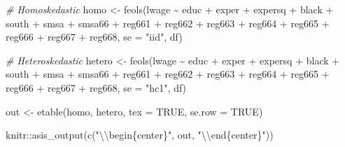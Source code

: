 \documentclass[
]{article}
\newenvironment{Shaded}{\begin{snugshade}}{\end{snugshade}}
\newcommand{\AttributeTok}[1]{\textcolor[rgb]{0.77,0.63,0.00}{#1}}
\newcommand{\CommentTok}[1]{\textcolor[rgb]{0.56,0.35,0.01}{\textit{#1}}}
\newcommand{\ConstantTok}[1]{\textcolor[rgb]{0.00,0.00,0.00}{#1}}
\newcommand{\FunctionTok}[1]{\textcolor[rgb]{0.00,0.00,0.00}{#1}}
\newcommand{\NormalTok}[1]{#1}
\newcommand{\OtherTok}[1]{\textcolor[rgb]{0.56,0.35,0.01}{#1}}
\newcommand{\SpecialCharTok}[1]{\textcolor[rgb]{0.00,0.00,0.00}{#1}}
\newcommand{\StringTok}[1]{\textcolor[rgb]{0.31,0.60,0.02}{#1}}
\begin{document}
\begin{Shaded}
\begin{Highlighting}[]
\CommentTok{\# Homoskedastic}
\NormalTok{homo }\OtherTok{\textless{}{-}} \FunctionTok{feols}\NormalTok{(lwage }\SpecialCharTok{\textasciitilde{}}\NormalTok{ educ }\SpecialCharTok{+}\NormalTok{ exper }\SpecialCharTok{+}\NormalTok{ expersq }\SpecialCharTok{+}\NormalTok{ black }\SpecialCharTok{+}\NormalTok{ south }\SpecialCharTok{+}\NormalTok{ smsa }\SpecialCharTok{+}\NormalTok{ smsa66 }\SpecialCharTok{+}
\NormalTok{              reg661 }\SpecialCharTok{+}\NormalTok{ reg662 }\SpecialCharTok{+}\NormalTok{ reg663 }\SpecialCharTok{+}\NormalTok{ reg664 }\SpecialCharTok{+}\NormalTok{ reg665 }\SpecialCharTok{+}\NormalTok{ reg666 }\SpecialCharTok{+}\NormalTok{ reg667 }\SpecialCharTok{+}\NormalTok{ reg668,}
              \AttributeTok{se =} \StringTok{"iid"}\NormalTok{, df)}

\CommentTok{\# Heteroskedastic}
\NormalTok{hetero }\OtherTok{\textless{}{-}} \FunctionTok{feols}\NormalTok{(lwage }\SpecialCharTok{\textasciitilde{}}\NormalTok{ educ }\SpecialCharTok{+}\NormalTok{ exper }\SpecialCharTok{+}\NormalTok{ expersq }\SpecialCharTok{+}\NormalTok{ black }\SpecialCharTok{+}\NormalTok{ south }\SpecialCharTok{+}\NormalTok{ smsa }\SpecialCharTok{+}\NormalTok{ smsa66 }\SpecialCharTok{+}
\NormalTok{                reg661 }\SpecialCharTok{+}\NormalTok{ reg662 }\SpecialCharTok{+}\NormalTok{ reg663 }\SpecialCharTok{+}\NormalTok{ reg664 }\SpecialCharTok{+}\NormalTok{ reg665 }\SpecialCharTok{+}\NormalTok{ reg666 }\SpecialCharTok{+}\NormalTok{ reg667 }\SpecialCharTok{+}\NormalTok{ reg668,}
                \AttributeTok{se =} \StringTok{"hc1"}\NormalTok{, df)}

\NormalTok{out }\OtherTok{\textless{}{-}} \FunctionTok{etable}\NormalTok{(homo, hetero, }\AttributeTok{tex =} \ConstantTok{TRUE}\NormalTok{, }\AttributeTok{se.row =} \ConstantTok{TRUE}\NormalTok{) }
\end{Highlighting}
\end{Shaded}

\begin{Shaded}
\begin{Highlighting}[]
\NormalTok{knitr}\SpecialCharTok{::}\FunctionTok{asis\_output}\NormalTok{(}\FunctionTok{c}\NormalTok{(}\StringTok{"}\SpecialCharTok{\textbackslash{}\textbackslash{}}\StringTok{begin\{center\}"}\NormalTok{, out, }\StringTok{"}\SpecialCharTok{\textbackslash{}\textbackslash{}}\StringTok{end\{center\}"}\NormalTok{)) }
\end{Highlighting}
\end{Shaded}
\end{document}
